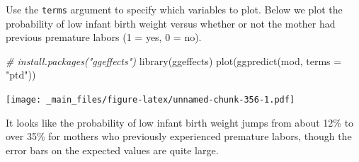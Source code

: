 \documentclass[
]{book}
\newenvironment{Shaded}{\begin{snugshade}}{\end{snugshade}}
\newcommand{\AttributeTok}[1]{\textcolor[rgb]{0.77,0.63,0.00}{#1}}
\newcommand{\CommentTok}[1]{\textcolor[rgb]{0.56,0.35,0.01}{\textit{#1}}}
\newcommand{\FunctionTok}[1]{\textcolor[rgb]{0.00,0.00,0.00}{#1}}
\newcommand{\NormalTok}[1]{#1}
\newcommand{\StringTok}[1]{\textcolor[rgb]{0.31,0.60,0.02}{#1}}
\begin{document}
Use the \texttt{terms} argument to specify which variables to plot. Below we plot the probability of low infant birth weight versus whether or not the mother had previous premature labors (1 = yes, 0 = no).

\begin{Shaded}
\begin{Highlighting}[]
\CommentTok{\# install.packages("ggeffects")}
\FunctionTok{library}\NormalTok{(ggeffects)}
\FunctionTok{plot}\NormalTok{(}\FunctionTok{ggpredict}\NormalTok{(mod, }\AttributeTok{terms =} \StringTok{"ptd"}\NormalTok{))}
\end{Highlighting}
\end{Shaded}

\texttt{[image: \_main\_files/figure-latex/unnamed-chunk-356-1.pdf]}

It looks like the probability of low infant birth weight jumps from about 12\% to over 35\% for mothers who previously experienced premature labors, though the error bars on the expected values are quite large.

  
\end{document}
